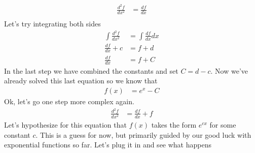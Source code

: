 \documentclass[book.tex]{subfiles}
\begin{document}
\begin{align}
    \frac{d^2 f}{dx^2} &= \frac{df}{dx} \\
\end{align}
Let's try integrating both sides
\begin{align}
    \int \frac{d^2 f}{dx^2} &= \int \frac{df}{dx} dx \\
    \frac{df}{dx} + c &= f + d \\
    \frac{df}{dx} &= f + C 
\end{align}
In the last step we have combined the constants and set $C = d - c$. Now we've already solved this last equation so we know that
\begin{align}
    f(x) &= e^{x} - C
\end{align}
Ok, let's go one step more complex again.
\begin{align}
    \frac{d^2 f}{dx^2} &= \frac{d f}{dx} + f
\end{align}
Let's hypothesize for this equation that $f(x)$ takes the form $e^{cx}$ for some constant $c$. This is a guess for now, but primarily guided by our good luck with exponential functions so far. Let's plug it in and see what happens
\end{document}
